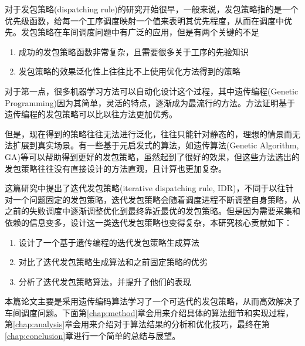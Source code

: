 对于发包策略(dispatching rule)的研究开始很早，一般来说，发包策略指的是一个优先级函数，给每一个工序调度映射一个值来表明其优先程度，从而在调度中优先。发包策略在车间调度问题中有广泛的应用，但是有两个关键的不足

\begin{enumerate}
    \item 成功的发包策略函数非常复杂，且需要很多关于工序的先验知识
    \item 发包策略的效果泛化性上往往比不上使用优化方法得到的策略
\end{enumerate}

对于第一点，很多机器学习方法可以自动化设计这个过程，其中遗传编程(Genetic Programming)因为其简单，灵活的特点，逐渐成为最流行的方法。方法证明基于遗传编程的发包策略可以比以往方法更加优秀。

但是，现在得到的策略往往无法进行泛化，往往只能针对静态的，理想的情景而无法扩展到真实场景。有一些基于元启发式的算法，如遗传算法(Genetic Algorithm, GA)等可以帮助得到更好的发包策略，虽然起到了很好的效果，但这些方法选出的发包策略往往没有直接设计的方法直观，且计算也更加复杂。

这篇研究中提出了迭代发包策略(iterative dispatching rule, IDR)，不同于以往针对一个问题固定的发包策略，迭代发包策略会随着调度进程不断调整自身策略，从之前的失败调度中逐渐调整优化到最终靠近最优的发包策略。但是因为需要采集和依赖的信息变多，设计这一类迭代发包策略也变得复杂，本研究核心贡献如下：

\begin{enumerate}
    \item 设计了一个基于遗传编程的迭代发包策略生成算法
    \item 对比了迭代发包策略生成算法和之前固定策略的优劣
    \item 分析了迭代发包策略算法，并提升了他们的表现
\end{enumerate}

本篇论文主要是采用遗传编码算法学习了一个可迭代的发包策略，从而高效解决了车间调度问题。下面第\ref{chap:method}章会用来介绍具体的算法细节和实现过程，第\ref{chap:analysis}章会用来介绍对于算法结果的分析和优化技巧，最终在第\ref{chap:conclusion}章进行一个简单的总结与展望。